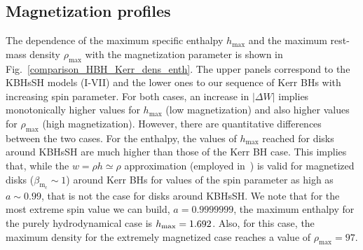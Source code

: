 \documentclass[twocolumn,aps,showpacs,showkeys,prd,superscriptaddress,byrevtex, amsmath]{revtex4-1}
\begin{document}
\subsection{Magnetization profiles}

The dependence of the maximum specific enthalpy $h_{\mathrm{max}}$ and the maximum rest-mass density $\rho_{\mathrm{max}}$ with the magnetization parameter is shown in Fig.~\ref{comparison_HBH_Kerr_dens_enth}. The upper panels correspond to the KBHsSH models (I-VII) and the lower ones to our sequence of Kerr BHs with increasing spin parameter. For both cases, an increase in $|\Delta W|$ implies monotonically  higher values for $h_{\mathrm{max}}$ (low magnetization) and also higher values for $\rho_{\mathrm{max}}$ (high magnetization). However, there are quantitative differences between the two cases. For the enthalpy, the values of $h_{\mathrm{max}}$ reached for disks around KBHsSH are much higher than those of the Kerr BH case. This implies that, while the $w = \rho h \simeq \rho$ approximation (employed in~\cite{Komissarov:2006,Gimeno-Soler:2017}) is valid for magnetized disks ($\beta_{\mathrm{m_c}} \sim 1$) around Kerr BHs for values of the spin parameter as high as $a \sim 0.99$, that is not the case for disks around KBHsSH. We note that for the most extreme spin value we can build, $a=0.9999999$, the maximum enthalpy for the purely hydrodynamical case is $h_{\rm max}=1.692$. Also, for this case, the maximum density for the extremely magnetized case reaches a value of $\rho_{\mathrm{max}} = 97$. 
\end{document}
